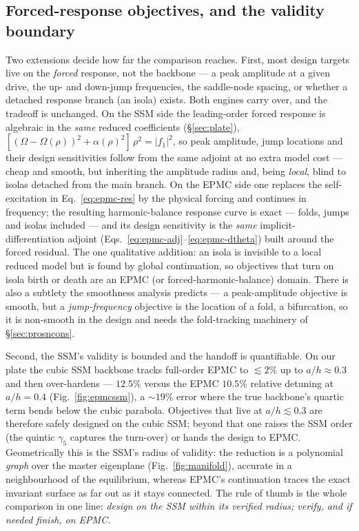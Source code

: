 \documentclass[11pt]{article}
\newcommand{\Om}{\Omega}
\begin{document}
\subsection{Forced-response objectives, and the validity boundary}
\label{sec:handoff}
Two extensions decide how far the comparison reaches. First, most design targets live
on the \emph{forced} response, not the backbone --- a peak amplitude at a given drive,
the up- and down-jump frequencies, the saddle-node spacing, or whether a detached
response branch (an isola) exists. Both engines carry over, and the tradeoff is
unchanged. On the SSM side the leading-order forced response is algebraic in the
\emph{same} reduced coefficients (\S\ref{sec:plate}),
$[(\Om-\Om(\rho))^2+\alpha(\rho)^2]\,\rho^2=|f_1|^2$, so peak amplitude, jump locations
and their design sensitivities follow from the same adjoint at no extra model cost ---
cheap and smooth, but inheriting the amplitude radius and, being \emph{local}, blind to
isolas detached from the main branch. On the EPMC side one replaces the self-excitation
in Eq.~\eqref{eq:epmc-res} by the physical forcing and continues in frequency; the
resulting harmonic-balance response curve is exact --- folds, jumps and isolas included
--- and its design sensitivity is the \emph{same} implicit-differentiation adjoint
(Eqs.~\eqref{eq:epmc-adj}--\eqref{eq:epmc-dtheta}) built around the forced residual. The
one qualitative addition: an isola is invisible to a local reduced model but is found by
global continuation, so objectives that turn on isola birth or death are an EPMC (or
forced-harmonic-balance) domain. There is also a subtlety the smoothness analysis
predicts --- a peak-amplitude objective is smooth, but a \emph{jump-frequency} objective
is the location of a fold, a bifurcation, so it is non-smooth in the design and needs the
fold-tracking machinery of \S\ref{sec:prosncons}.

Second, the SSM's validity is bounded and the handoff is quantifiable. On our plate the
cubic SSM backbone tracks full-order EPMC to $\lesssim\!2\%$ up to $a/h\approx0.3$ and
then over-hardens --- $12.5\%$ versus the EPMC $10.5\%$ relative detuning at $a/h=0.4$
(Fig.~\ref{fig:epmcssm}), a $\sim\!19\%$ error where the true backbone's quartic term
bends below the cubic parabola. Objectives that live at $a/h\lesssim0.3$ are therefore
safely designed on the cubic SSM; beyond that one raises the SSM order (the quintic
$\gamma_5$ captures the turn-over) or hands the design to EPMC. Geometrically this is
the SSM's radius of validity: the reduction is a polynomial \emph{graph} over the master
eigenplane (Fig.~\ref{fig:manifold}), accurate in a neighbourhood of the equilibrium,
whereas EPMC's continuation traces the exact invariant surface as far out as it stays
connected. The rule of thumb is the whole comparison in one line: \emph{design on the
SSM within its verified radius; verify, and if needed finish, on EPMC.}
\end{document}
